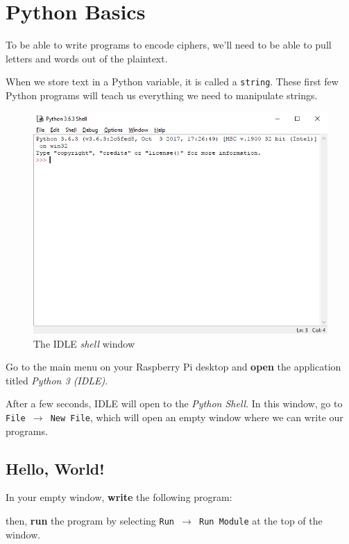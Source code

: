 \section{Python Basics} \label{python}

	To be able to write programs to encode ciphers, we'll need to be able to pull letters and words out of the plaintext.
	
	When we store text in a Python variable, it is called a \texttt{string}. These first few Python programs will teach us everything we need to manipulate strings.
	
	\begin{figure}[h]
		\centering
		\includegraphics[width=0.8\linewidth]{McrRaspJam/016_Ciphers/1_python/idle}
		\caption{The IDLE \textit{shell} window}
		\label{fig:idle}
	\end{figure}
	
	Go to the main menu on your Raspberry Pi desktop and \textbf{open} the application titled \textit{Python 3 (IDLE)}.
	
	After a few seconds, IDLE will open to the \textit{Python Shell}. In this window, go to \texttt{File $\rightarrow$ New File}, which will open an empty window where we can write our programs.
	
	\subsection*{Hello, World!}
		
		In your empty window, \textbf{write} the following program:
		
		
		
		then, \textbf{run} the program by selecting \texttt{Run $\rightarrow$ Run Module} at the top of the window.
		
